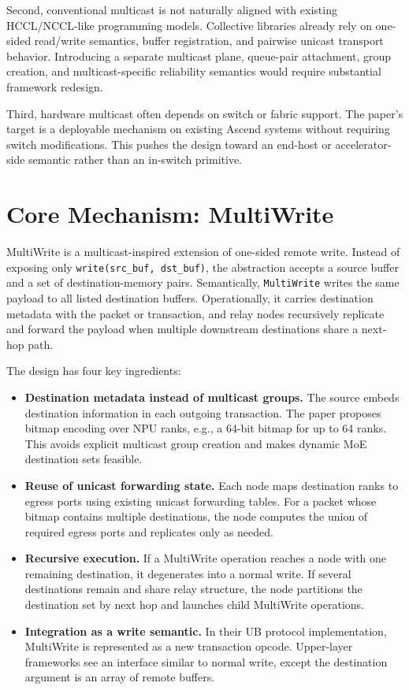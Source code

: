 \documentclass[10pt]{article}
\begin{document}
Second, conventional multicast is not naturally aligned with existing HCCL/NCCL-like programming models. Collective libraries already rely on one-sided read/write semantics, buffer registration, and pairwise unicast transport behavior. Introducing a separate multicast plane, queue-pair attachment, group creation, and multicast-specific reliability semantics would require substantial framework redesign.

Third, hardware multicast often depends on switch or fabric support. The paper's target is a deployable mechanism on existing Ascend systems without requiring switch modifications. This pushes the design toward an end-host or accelerator-side semantic rather than an in-switch primitive.

\section{Core Mechanism: MultiWrite}

MultiWrite is a multicast-inspired extension of one-sided remote write. Instead of exposing only \texttt{write(src\_buf, dst\_buf)}, the abstraction accepts a source buffer and a set of destination-memory pairs. Semantically, \texttt{MultiWrite} writes the same payload to all listed destination buffers. Operationally, it carries destination metadata with the packet or transaction, and relay nodes recursively replicate and forward the payload when multiple downstream destinations share a next-hop path.

The design has four key ingredients:

\begin{itemize}
  \item \textbf{Destination metadata instead of multicast groups.} The source embeds destination information in each outgoing transaction. The paper proposes bitmap encoding over NPU ranks, e.g., a 64-bit bitmap for up to 64 ranks. This avoids explicit multicast group creation and makes dynamic MoE destination sets feasible.
  \item \textbf{Reuse of unicast forwarding state.} Each node maps destination ranks to egress ports using existing unicast forwarding tables. For a packet whose bitmap contains multiple destinations, the node computes the union of required egress ports and replicates only as needed.
  \item \textbf{Recursive execution.} If a MultiWrite operation reaches a node with one remaining destination, it degenerates into a normal write. If several destinations remain and share relay structure, the node partitions the destination set by next hop and launches child MultiWrite operations.
  \item \textbf{Integration as a write semantic.} In their UB protocol implementation, MultiWrite is represented as a new transaction opcode. Upper-layer frameworks see an interface similar to normal write, except the destination argument is an array of remote buffers.
\end{itemize}
\end{document}
